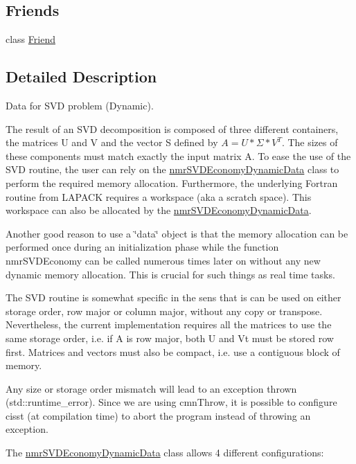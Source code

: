 \subsection*{Friends}
\begin{DoxyCompactItemize}
\item 
class \hyperlink{classnmr_s_v_d_economy_dynamic_data_a7f8321d57e81bc613d5dbef3410ba70e}{Friend}
\end{DoxyCompactItemize}


\subsection{Detailed Description}
Data for S\-V\-D problem (Dynamic). 

The result of an S\-V\-D decomposition is composed of three different containers, the matrices U and V and the vector S defined by $ A = U * \Sigma * V^{T} $. The sizes of these components must match exactly the input matrix A. To ease the use of the S\-V\-D routine, the user can rely on the \hyperlink{classnmr_s_v_d_economy_dynamic_data}{nmr\-S\-V\-D\-Economy\-Dynamic\-Data} class to perform the required memory allocation. Furthermore, the underlying Fortran routine from L\-A\-P\-A\-C\-K requires a workspace (aka a scratch space). This workspace can also be allocated by the \hyperlink{classnmr_s_v_d_economy_dynamic_data}{nmr\-S\-V\-D\-Economy\-Dynamic\-Data}.

Another good reason to use a \char`\"{}data\char`\"{} object is that the memory allocation can be performed once during an initialization phase while the function nmr\-S\-V\-D\-Economy can be called numerous times later on without any new dynamic memory allocation. This is crucial for such things as real time tasks.

The S\-V\-D routine is somewhat specific in the sens that is can be used on either storage order, row major or column major, without any copy or transpose. Nevertheless, the current implementation requires all the matrices to use the same storage order, i.\-e. if A is row major, both U and Vt must be stored row first. Matrices and vectors must also be compact, i.\-e. use a contiguous block of memory.

Any size or storage order mismatch will lead to an exception thrown (std\-::runtime\-\_\-error). Since we are using cmn\-Throw, it is possible to configure cisst (at compilation time) to abort the program instead of throwing an exception.

The \hyperlink{classnmr_s_v_d_economy_dynamic_data}{nmr\-S\-V\-D\-Economy\-Dynamic\-Data} class allows 4 different configurations\-:


